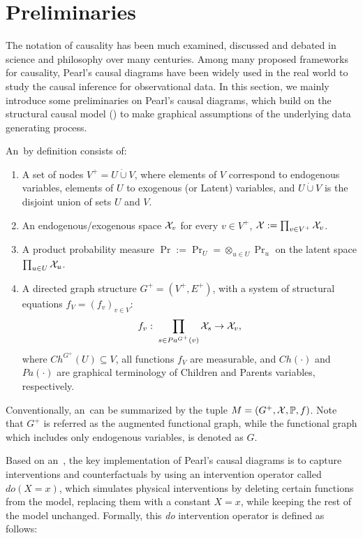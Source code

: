 \section{Preliminaries}

 
The notation of causality has been much examined, discussed and debated in science and philosophy over many centuries. Among many proposed frameworks for causality, Pearl's causal diagrams have been widely used in the real world to study the causal inference for observational data. In this section, we mainly introduce some preliminaries on Pearl's causal diagrams, which build on the structural causal model (\SCM) to make graphical assumptions of the underlying data generating process. 




\begin{Def}
	\label{SCM-def}
	An \SCM\,by definition consists of: 
	\begin{enumerate}
		\setlength\itemsep{0em}
		\item A set of nodes $V^+=U \dot \cup V$, where elements of $V$ correspond to endogenous variables, elements of $U$ to exogenous (or Latent) variables, and 
		$U \dot \cup V$ is the disjoint union of sets $U$ and $V$.
		
		\item An endogenous/exogenous space $\mathcal{X}_v$ for every $v \in V^+$, $\mathcal{X}:=\prod_{v \in V^+}\mathcal{X}_v$.
		
		\item A product probability measure $\Pr:=\Pr_U=\otimes_{u \in U} \Pr_u$ on the latent space $\prod_{u \in U} \mathcal{X}_u$. 
		
		\item A directed graph structure $G^+=(V^+, E^+)$, with a system of structural equations  $f_V = (f_v)_{v \in V}$:
		\[f_v: \; \prod_{s \in  Pa^{G^+}(v)}\mathcal{X}_s \to \mathcal{X}_v,\]
		where $Ch^{G^+}(U) \subseteq V$, all functions $f_V$ are measurable, and $Ch(\cdot )$ and $Pa(\cdot)$ are graphical terminology of Children and Parents variables, respectively. 
	\end{enumerate}
	Conventionally, an \SCM\,can be summarized by the tuple $M=(G^+,\mathcal{X},\mathbb{P}, f)$. Note that $G^+$ is referred as the augmented functional graph, while the functional graph which includes only endogenous variables, is denoted as $G$. 
\end{Def}

Based on an \SCM\,, the key implementation of Pearl's causal diagrams is to capture interventions and counterfactuals by using an intervention operator called  $do(X=x)$, which  
simulates physical interventions by deleting certain functions from the model, replacing them with a constant $X=x$, while keeping the rest of the model unchanged.
Formally, this \emph{do} intervention operator is defined as follows: 

